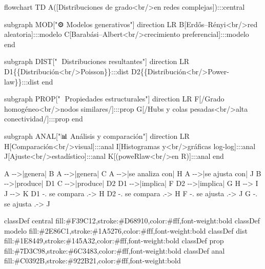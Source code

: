 \documentclass[
  letterpaper,
  DIV=11,
  numbers=noendperiod]{scrreprt}
\newenvironment{Shaded}{\begin{snugshade}}{\end{snugshade}}
\newcommand{\NormalTok}[1]{\textcolor[rgb]{0.00,0.23,0.31}{#1}}
\begin{document}
\begin{Shaded}
\begin{Highlighting}[]
\NormalTok{flowchart TD}
\NormalTok{    A([Distribuciones de grado\textless{}br/\textgreater{}en redes complejas]):::central}

\NormalTok{    subgraph MOD["⚙️ Modelos generativos"]}
\NormalTok{        direction LR}
\NormalTok{        B[Erdős–Rényi\textless{}br/\textgreater{}red aleatoria]:::modelo}
\NormalTok{        C[Barabási–Albert\textless{}br/\textgreater{}crecimiento preferencial]:::modelo}
\NormalTok{    end}

\NormalTok{    subgraph DIST["📐 Distribuciones resultantes"]}
\NormalTok{        direction LR}
\NormalTok{        D1\{\{Distribución\textless{}br/\textgreater{}Poisson\}\}:::dist}
\NormalTok{        D2\{\{Distribución\textless{}br/\textgreater{}Power{-}law\}\}:::dist}
\NormalTok{    end}

\NormalTok{    subgraph PROP["🔎 Propiedades estructurales"]}
\NormalTok{        direction LR}
\NormalTok{        F[/Grado homogéneo\textless{}br/\textgreater{}nodos similares/]:::prop}
\NormalTok{        G[/Hubs y colas pesadas\textless{}br/\textgreater{}alta conectividad/]:::prop}
\NormalTok{    end}

\NormalTok{    subgraph ANAL["📊 Análisis y comparación"]}
\NormalTok{        direction LR}
\NormalTok{        H[Comparación\textless{}br/\textgreater{}visual]:::anal}
\NormalTok{        I[Histogramas y\textless{}br/\textgreater{}gráficas log{-}log]:::anal}
\NormalTok{        J[Ajuste\textless{}br/\textgreater{}estadístico]:::anal}
\NormalTok{        K[(poweRlaw\textless{}br/\textgreater{}en R)]:::anal}
\NormalTok{    end}

\NormalTok{    A {-}{-}\textgreater{}|genera| B}
\NormalTok{    A {-}{-}\textgreater{}|genera| C}
\NormalTok{    A {-}{-}\textgreater{}|se analiza con| H}
\NormalTok{    A {-}{-}\textgreater{}|se ajusta con| J}
\NormalTok{    B {-}{-}\textgreater{}|produce| D1}
\NormalTok{    C {-}{-}\textgreater{}|produce| D2}
\NormalTok{    D1 {-}{-}\textgreater{}|implica| F}
\NormalTok{    D2 {-}{-}\textgreater{}|implica| G}
\NormalTok{    H {-}{-}\textgreater{} I}
\NormalTok{    J {-}{-}\textgreater{} K}
\NormalTok{    D1 {-}. se compara .{-}\textgreater{} H}
\NormalTok{    D2 {-}. se compara .{-}\textgreater{} H}
\NormalTok{    F {-}. se ajusta .{-}\textgreater{} J}
\NormalTok{    G {-}. se ajusta .{-}\textgreater{} J}

\NormalTok{    classDef central fill:\#F39C12,stroke:\#D68910,color:\#fff,font{-}weight:bold}
\NormalTok{    classDef modelo fill:\#2E86C1,stroke:\#1A5276,color:\#fff,font{-}weight:bold}
\NormalTok{    classDef dist fill:\#1E8449,stroke:\#145A32,color:\#fff,font{-}weight:bold}
\NormalTok{    classDef prop fill:\#7D3C98,stroke:\#6C3483,color:\#fff,font{-}weight:bold}
\NormalTok{    classDef anal fill:\#C0392B,stroke:\#922B21,color:\#fff,font{-}weight:bold}
\end{Highlighting}
\end{Shaded}
\end{document}
